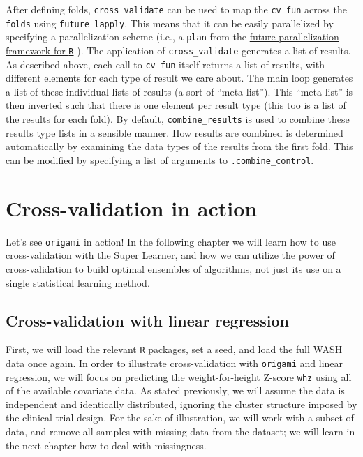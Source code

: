 \documentclass[12pt, krantz2,]{book}
\theoremstyle{definition}
\theoremstyle{definition}
\theoremstyle{definition}
\newcommand{\1}{\mathbbm{1}}
\begin{document}
After defining folds, \texttt{cross\_validate} can be used to map the \texttt{cv\_fun} across
the \texttt{folds} using \texttt{future\_lapply}. This means that it can be easily parallelized
by specifying a parallelization scheme (i.e., a \texttt{plan} from the \href{https://Cran.R-project.org/package=future}{future
parallelization framework for \texttt{R}}
\citep{bengtsson2020unifying}). The application of \texttt{cross\_validate} generates a list
of results. As described above, each call to \texttt{cv\_fun} itself returns a list of
results, with different elements for each type of result we care about. The main
loop generates a list of these individual lists of results (a sort of
``meta-list''). This ``meta-list'' is then inverted such that there is one element
per result type (this too is a list of the results for each fold). By default,
\texttt{combine\_results} is used to combine these results type lists in a sensible
manner. How results are combined is determined automatically by examining the
data types of the results from the first fold. This can be modified by
specifying a list of arguments to \texttt{.combine\_control}.

\hypertarget{cross-validation-in-action}{%
\section{Cross-validation in action}\label{cross-validation-in-action}}

Let's see \texttt{origami} in action! In the following chapter we will learn how to use
cross-validation with the Super Learner, and how we can utilize the power of
cross-validation to build optimal ensembles of algorithms, not just its use on a
single statistical learning method.

\hypertarget{cross-validation-with-linear-regression}{%
\subsection{Cross-validation with linear regression}\label{cross-validation-with-linear-regression}}

First, we will load the relevant \texttt{R} packages, set a seed, and load the full
WASH data once again. In order to illustrate cross-validation with \texttt{origami} and
linear regression, we will focus on predicting the weight-for-height Z-score
\texttt{whz} using all of the available covariate data. As stated previously, we will
assume the data is independent and identically distributed, ignoring the cluster
structure imposed by the clinical trial design. For the sake of illustration, we
will work with a subset of data, and remove all samples with missing data from
the dataset; we will learn in the next chapter how to deal with missingness.
\end{document}
